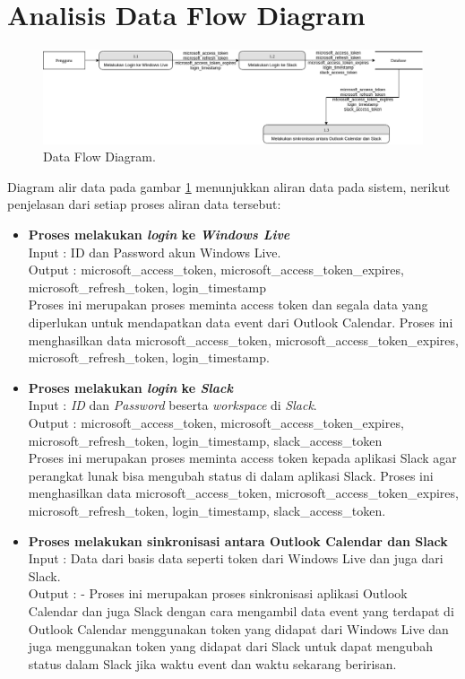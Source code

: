 \section{Analisis Data Flow Diagram}

\begin{figure}[h]
  \includegraphics[width=15cm]{./Gambar/DFD.png}
  \centering
  \caption{Data Flow Diagram.}
  \label{fig:dfd}
\end{figure}

Diagram alir data pada gambar \ref{fig:dfd} menunjukkan aliran data pada sistem, nerikut penjelasan dari setiap proses aliran data tersebut:
\begin{itemize}
    \item \textbf{Proses melakukan \textit{login} ke \textit{Windows Live}}\\
    Input : ID dan Password akun Windows Live.\\
    Output : microsoft\_access\_token, microsoft\_access\_token\_expires, microsoft\_refresh\_token, login\_timestamp\\
    Proses ini merupakan proses meminta access token dan segala data yang diperlukan untuk mendapatkan data event dari Outlook Calendar. Proses ini menghasilkan data microsoft\_access\_token, microsoft\_access\_token\_expires, microsoft\_refresh\_token, login\_timestamp. 
    \item \textbf{Proses melakukan \textit{login} ke \textit{Slack}}\\
    Input : \textit{ID} dan \textit{Password} beserta \textit{workspace} di \textit{Slack}.\\
    Output : microsoft\_access\_token, microsoft\_access\_token\_expires, microsoft\_refresh\_token, login\_timestamp, slack\_access\_token\\
    Proses ini merupakan proses meminta access token kepada aplikasi Slack agar perangkat lunak bisa mengubah status di dalam aplikasi Slack. Proses ini menghasilkan data microsoft\_access\_token, microsoft\_access\_token\_expires, microsoft\_refresh\_token, login\_timestamp, slack\_access\_token. 
    \item \textbf{Proses melakukan sinkronisasi antara Outlook Calendar dan Slack}\\
    Input : Data dari basis data seperti token dari Windows Live dan juga dari Slack.\\
    Output : -
    Proses ini merupakan proses sinkronisasi aplikasi Outlook Calendar dan juga Slack dengan cara mengambil data event yang terdapat di Outlook Calendar menggunakan token yang didapat dari Windows Live dan juga menggunakan token yang didapat dari Slack untuk dapat mengubah status dalam Slack jika waktu event dan waktu sekarang beririsan. 
\end{itemize}
